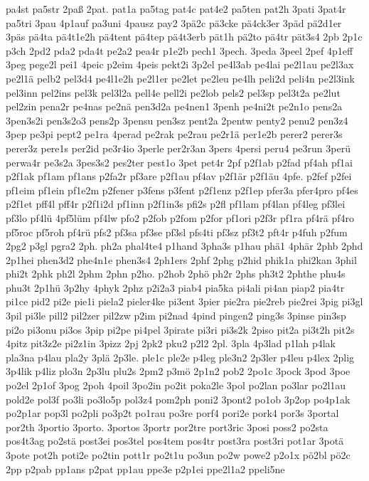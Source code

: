 {pa4st
pa5str
2paß
2pat.
pat1a
pa5tag
pat4c
pat4e2
pa5ten
pat2h
3pati
3pat4r
pa5tri
3pau
4p1auf
pa3uni
4pausz
pay2
3pä2c
pä3cke
pä4ck3er
3päd
pä2d1er
3päs
pä4ta
pä4t1e2h
pä4tent
pä4tep
pä4t3erb
pät1h
pä2to
pä4tr
pät3s4
2pb
2p1c
p3ch
2pd2
pda2
pda4t
pe2a2
pea4r
p1e2b
pech1
3pech.
3peda
3peel
2pef
4p1eff
3peg
pege2l
pei1
4peic
p2eim
4peis
pekt2i
3p2el
pe4l3ab
pe4lai
pe2l1au
pe2l3ax
pe2l1ä
pelb2
pel3d4
pe4l1e2h
pe2l1er
pe2let
pe2leu
pe4lh
peli2d
peli4n
pe2l3ink
pel3inn
pel2ins
pel3k
pel3l2a
pell4e
pell2i
pe2lob
pels2
pel3sp
pel3t2a
pe2lut
pel2zin
pena2r
pe4nas
pe2nä
pen3d2a
pe4nen1
3penh
pe4ni2t
pe2n1o
pens2a
3pen3s2i
pen3s2o3
pens2p
3pensu
pen3sz
pent2a
2pentw
penty2
penu2
pen3z4
3pep
pe3pi
pept2
pe1ra
4perad
pe2rak
pe2rau
pe2r1ä
per1e2b
perer2
perer3s
perer3z
pere1s
per2id
pe3r4io
3perle
per2r3an
3pers
4persi
peru4
pe3run
3perü
perwa4r
pe3s2a
3pes3s2
pes2ter
pest1o
3pet
pet4r
2pf
p2f1ab
p2fad
pf4ah
pf1ai
p2f1ak
pf1am
pf1ans
p2fa2r
pf3are
p2f1au
pf4av
p2f1är
p2f1äu
4pfe.
p2fef
p2fei
pf1eim
pf1ein
pf1e2m
p2fener
p3fens
p3fent
p2f1enz
p2f1ep
pfer3a
pfer4pro
pf4es
p2f1et
pff4l
pff4r
p2f1i2d
pf1inn
p2f1in3s
pfi2s
p2fl
pf1lam
pf4lan
pf4leg
pf3lei
pf3lo
pf4lü
4pf5lüm
pf4lw
pfo2
p2fob
p2fom
p2for
pf1ori
p2f3r
pf1ra
pf4rä
pf4ro
pf5roc
pf5roh
pf4rü
pfs2
pf3sa
pf3se
pf3sl
pfs4ti
pf3sz
pf3t2
pft4r
p4fuh
p2fum
2pg2
p3gl
pgra2
2ph.
ph2a
phal4te4
p1hand
3pha3s
p1hau
phä1
4phär
2phb
2phd
2p1hei
phen3d2
phe4n1e
phen3s4
2ph1ers
2phf
2phg
p2hid
phik1a
phi2kan
3phil
phi2t
2phk
ph2l
2phm
2phn
p2ho.
p2hob
2phö
ph2r
2phs
ph3t2
2phthe
phu4s
phu3t
2p1hü
3p2hy
4phyk
2phz
p2i2a3
piab4
pia5ka
pi4ali
pi4an
piap2
pia4tr
pi1ce
pid2
pi2e
pie1i
piela2
pieler4ke
pi3ent
3pier
pie2ra
pie2reb
pie2rei
3pig
pi3gl
3pil
pi3le
pill2
pil2zer
pil2zw
p2im
pi2nad
4pind
pingen2
ping3s
3pinse
pin3sp
pi2o
pi3onu
pi3os
3pip
pi2pe
pi4pel
3pirate
pi3ri
pi3s2k
2piso
pit2a
pi3t2h
pit2s
4pitz
pit3z2e
pi2z1in
3pizz
2pj
2pk2
pku2
p2l2
2pl.
3pla
4p3lad
p1lah
p4lak
pla3na
p4lau
pla2y
3plä
2p3le.
ple1c
ple2e
p4leg
ple3n2
2p3ler
p4leu
p4lex
2plig
3p4lik
p4liz
plo3n
2p3lu
plu2s
2pm2
p3mö
2p1n2
pob2
2po1c
3pock
3pod
3poe
po2el
2p1of
3pog
2poh
4poil
3po2in
po2it
poka2le
3pol
po2lan
po3lar
po2l1au
pold2e
pol3f
po3li
po3lo5p
pol3z4
pom2ph
poni2
3pont2
po1ob
3p2op
po4p1ak
po2p1ar
pop3l
po2pli
po3p2t
po1rau
po3re
porf4
pori2e
pork4
por3s
3portal
por2th
3portio
3porto.
3portos
3portr
por2tre
port3ric
3posi
poss2
po2sta
pos4t3ag
po2stä
post3ei
pos3tel
pos4tem
pos4tr
post3ra
post3ri
pot1ar
3potä
3pote
pot2h
poti2e
po2tin
pott1r
po2t1u
po3un
po2w
powe2
p2o1x
pö2bl
pö2c
2pp
p2pab
pp1ans
p2pat
pp1au
ppe3e
p2p1ei
ppe2l1a2
ppeli5ne
}
